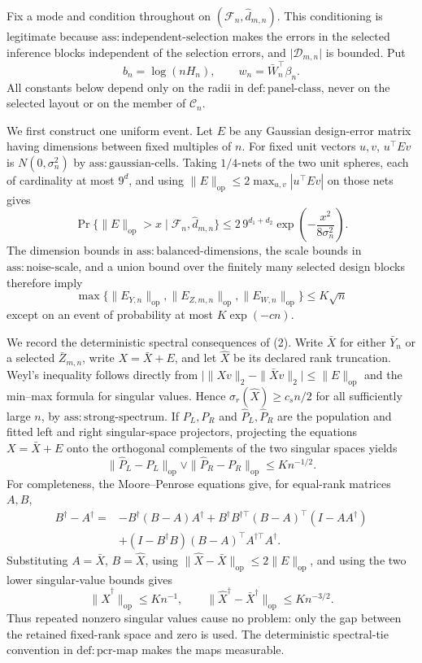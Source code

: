 Fix a mode and condition throughout on \( (\mathcal F_n,\widehat d_{m,n}) \).  This conditioning is legitimate because \(\mathrm{ass{:}independent\mbox{-}selection}\) makes the errors in the selected inference blocks independent of the selection errors, and \(\lvert\mathcal D_{m,n}\rvert\) is bounded.  Put
\[
 b_n=\log(nH_n),\qquad w_n=\bar W_n^{\top}\beta_n .
\]
All constants below depend only on the radii in \(\mathrm{def{:}panel\mbox{-}class}\), never on the selected layout or on the member of \(\mathcal C_n\).

We first construct one uniform event.  Let \(E\) be any Gaussian design-error matrix having dimensions between fixed multiples of \(n\).  For fixed unit vectors \(u,v\), \(u^{\top}Ev\) is \(N(0,\sigma_n^2)\) by \(\mathrm{ass{:}gaussian\mbox{-}cells}\).  Taking \(1/4\)-nets of the two unit spheres, each of cardinality at most \(9^d\), and using \(\|E\|_{\mathrm{op}}\le2\max_{u,v}|u^{\top}Ev|\) on those nets gives
\[
 \Pr\{\|E\|_{\mathrm{op}}>x\mid\mathcal F_n,\widehat d_{m,n}\}
 \le 2\,9^{d_1+d_2}\exp\!\left(-\frac{x^2}{8\sigma_n^2}\right).
 \tag{1}
\]
The dimension bounds in \(\mathrm{ass{:}balanced\mbox{-}dimensions}\), the scale bounds in \(\mathrm{ass{:}noise\mbox{-}scale}\), and a union bound over the finitely many selected design blocks therefore imply
\[
 \max\{\|E_{Y,n}\|_{\mathrm{op}},\|E_{Z,m,n}\|_{\mathrm{op}},
             \|E_{W,n}\|_{\mathrm{op}}\}\le K\sqrt n
 \tag{2}
\]
except on an event of probability at most \(K\exp(-c n)\).

We record the deterministic spectral consequences of (2).  Write \(\bar X\) for either \(\bar Y_n\) or a selected \(\bar Z_{m,n}\), write \(X=\bar X+E\), and let \(\widehat X\) be its declared rank truncation.  Weyl's inequality follows directly from
\(\lvert\|Xv\|_2-\|\bar Xv\|_2\rvert\le\|E\|_{\mathrm{op}}\) and the min--max formula for singular values.  Hence \(\sigma_r(\widehat X)\ge c_s n/2\) for all sufficiently large \(n\), by \(\mathrm{ass{:}strong\mbox{-}spectrum}\).  If \(P_L,P_R\) and \(\widehat P_L,\widehat P_R\) are the population and fitted left and right singular-space projectors, projecting the equations \(X=\bar X+E\) onto the orthogonal complements of the two singular spaces yields
\[
 \|\widehat P_L-P_L\|_{\mathrm{op}}\vee
 \|\widehat P_R-P_R\|_{\mathrm{op}}\le K n^{-1/2}.
 \tag{3}
\]
For completeness, the Moore--Penrose equations give, for equal-rank matrices \(A,B\),
\[
\begin{aligned}
 B^\dagger-A^\dagger
={}&-B^\dagger(B-A)A^\dagger
 +B^\dagger B^{\dagger\top}(B-A)^\top(I-AA^\dagger)\\
 &+(I-B^\dagger B)(B-A)^\top A^{\dagger\top}A^\dagger .
\end{aligned}
 \tag{4}
\]
Substituting \(A=\bar X\), \(B=\widehat X\), using \(\|\widehat X-\bar X\|_{\mathrm{op}}\le2\|E\|_{\mathrm{op}}\), and using the two lower singular-value bounds gives
\[
 \|\widehat X^\dagger\|_{\mathrm{op}}\le K n^{-1},\qquad
 \|\widehat X^\dagger-\bar X^\dagger\|_{\mathrm{op}}\le K n^{-3/2}.
 \tag{5}
\]
Thus repeated nonzero singular values cause no problem: only the gap between the retained fixed-rank space and zero is used.  The deterministic spectral-tie convention in \(\mathrm{def{:}pcr\mbox{-}map}\) makes the maps measurable.

